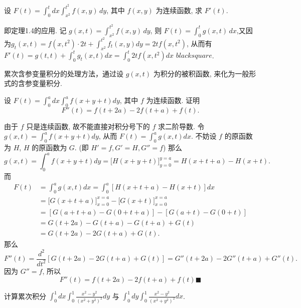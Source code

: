 \documentclass[lang=cn,newtx,10pt,scheme=chinese]{elegantbook}
\begin{document}
\begin{example}
设 $F(t) = \int_{0}^{t} dx \int_{x^2}^{t^2} f(x,y) \,dy$, 其中 $f(x,y)$ 为连续函数, 求 $F'(t)$.
\end{example}

\begin{solution}
即定理1.4的应用.
记 $g(x,t) = \int_{x^2}^{t^2} f(x,y) \,dy$, 则 $F(t) = \int_{0}^{t} g(x,t) \,dx$,又因为$g_t(x,t) = f(x,t^2)\cdot 2t + \int_{x^2}^{t^2} f_t(x,y)dy = 2tf(x,t^2)$,
从而有$F'(t) = g(t,t)+\int_{0}^{t}g_t(x,t)dx = \int_{0}^{t}2tf(x,t^2)dx$ $blacksquare$.
\end{solution}
\begin{note}
    累次含参变量积分的处理方法，通过设 $g(x,t)$ 为积分的被积函数, 来化为一般形式的含参变量积分.
\end{note}

\begin{example}
设 $F(t) = \int_0^a dx \int_0^a f(x+y+t) dy$, 其中 $f$ 为连续函数. 证明
$$F''(t) = f(t+2a) - 2f(t+a) + f(t).$$
\end{example}

\begin{solution}
由于 $f$ 只是连续函数, 故不能直接对积分号下的 $f$ 求二阶导数.
令 $g(x,t) = \int_0^a f(x+y+t) dy$, 从而 $F(t) = \int_0^a g(x,t) dx$.
不妨设 $f$ 的原函数为 $H$, $H$ 的原函数为 $G$. (即 $H'=f, G'=H, G''=f$)
那么
$$ g(x,t) = \int_0^a f(x+y+t) dy = \big[ H(x+y+t) \big]_{y=0}^{y=a} = H(x+t+a) - H(x+t). $$
而
\begin{align*}
F(t) &= \int_0^a g(x,t) dx = \int_0^a [H(x+t+a) - H(x+t)] dx \\
&= \big[ G(x+t+a) \big]_{x=0}^{x=a} - \big[ G(x+t) \big]_{x=0}^{x=a} \\
&= [G(a+t+a) - G(0+t+a)] - [G(a+t) - G(0+t)] \\
&= G(t+2a) - G(t+a) - G(t+a) + G(t) \\
&= G(t+2a) - 2G(t+a) + G(t).
\end{align*}
那么
$$ F''(t) = \frac{d^2}{dt^2} [G(t+2a) - 2G(t+a) + G(t)] = G''(t+2a) - 2G''(t+a) + G''(t). $$
因为 $G''=f$, 所以
$$ F''(t) = f(t+2a) - 2f(t+a) + f(t) \blacksquare$$
\end{solution}

\begin{example}[$\bigstar$]
计算累次积分 $\int_0^1 dx \int_0^1 \frac{x^2 - y^2}{(x^2 + y^2)^2} dy$ 与  $\int_0^1 dy \int_0^1 \frac{x^2 - y^2}{(x^2 + y^2)^2} dx$.
\end{example}
\end{document}
